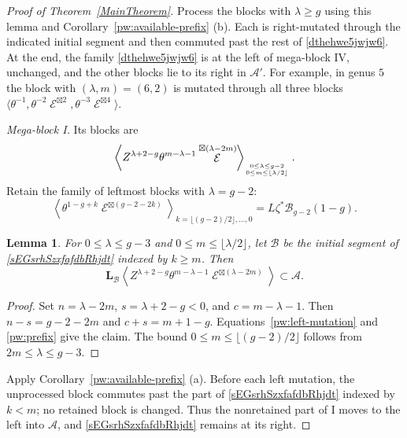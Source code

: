 \documentclass[10pt,a4paper]{amsart}
\newtheorem{lemma}{Lemma}
\DeclareMathOperator{\cE}{\mathcal{E}}
\begin{document}
\begin{proof}[Proof of Theorem~\ref{MainTheorem}]
Process the blocks with $\lambda\geq g$ using this lemma and
Corollary~\ref{pw:available-prefix}
(b).  Each is right-mutated through
the indicated initial segment and then commuted past the rest of
\eqref{dthehwe5jwjw6}.  At the end, the family
\eqref{dthehwe5jwjw6} is at the left of mega-block IV, unchanged,
and the other blocks lie to its right in $\mathcal A'$.
For example, in genus $5$ the block with $(\lambda,m)=(6,2)$ is
mutated through all three blocks
$
 \langle\theta^{-1},\theta^{-2}\cE^{\boxtimes2},
                \theta^{-3}\cE^{\boxtimes4}\rangle$.

\smallskip
\noindent\textit{Mega-block I.}
Its blocks are
\begin{equation}\label{sEGsrhSRhjdt}
 \left\langle Z^{\lambda+2-g}\theta^{m-\lambda-1}
           \cE^{\boxtimes(\lambda-2m)}\right\rangle_{{0\leq\lambda\leq g-2}\atop
           {0\leq m\leq\lfloor\lambda/2\rfloor}}.
\end{equation}
Retain the family of leftmost blocks with $\lambda=g-2$:
\begin{equation}\label{sEGsrhSzxfafdbRhjdt}
 \left\langle\theta^{1-g+k}\cE^{\boxtimes(g-2-2k)}
 \right\rangle_{k=\lfloor(g-2)/2\rfloor,\ldots,0}
       =L\zeta^*\mathcal B_{g-2}(1-g).
\end{equation}

\begin{lemma}\label{megablocki}
For $0\leq\lambda\leq g-3$ and
$0\leq m\leq\lfloor\lambda/2\rfloor$, let $\mathcal B$ be the
initial segment of \eqref{sEGsrhSzxfafdbRhjdt} indexed by $k\geq m$.
Then
\[
 \mathbf L_{\mathcal B}
 \left\langle Z^{\lambda+2-g}\theta^{m-\lambda-1}
              \cE^{\boxtimes(\lambda-2m)}\right\rangle
       \subset\mathcal A.
\]
\end{lemma}

\begin{proof}
Set $n=\lambda-2m$, $s=\lambda+2-g<0$, and $c=m-\lambda-1$.
Then $n-s=g-2-2m$ and $c+s=m+1-g$.
Equations~\eqref{pw:left-mutation} and \eqref{pw:prefix} give the
claim.  The bound $0\leq m\leq\lfloor(g-2)/2\rfloor$ follows
from $2m\leq\lambda\leq g-3$.
\end{proof}

Apply 
Corollary~\ref{pw:available-prefix}
(a).  Before each left mutation,
the unprocessed block commutes past the part of
\eqref{sEGsrhSzxfafdbRhjdt} indexed by $k<m$; no retained block
is changed.  Thus the nonretained part of I moves to the left into
$\mathcal A$, and \eqref{sEGsrhSzxfafdbRhjdt} remains at its right.


\end{proof}
\end{document}
